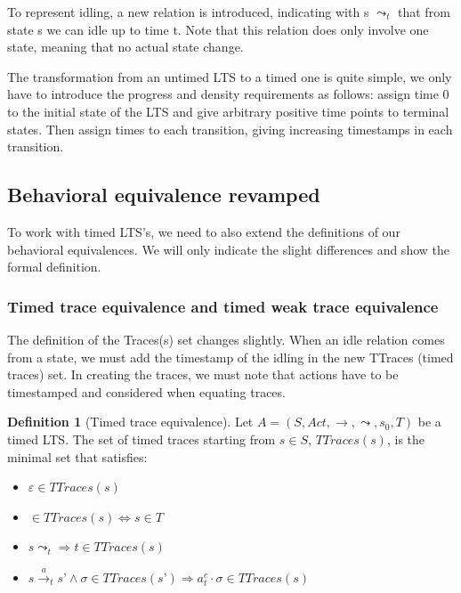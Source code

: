 \documentclass[11pt]{article}
\theoremstyle{definition}
\newtheorem{definition}{Definition}
\newcommand{\cmark}{\ding{51}}
\theoremstyle{plain}
\theoremstyle{definition}
\begin{document}
To represent idling, a new relation is introduced, indicating with s $ \leadsto_{t} $ that from state s we can idle up to time t. Note that this relation does only involve one state, meaning that no actual state change.

The transformation from an untimed LTS to a timed one is quite simple, we only have to introduce the progress and density requirements as follows: assign time 0 to the initial state of the LTS and give arbitrary positive time points to terminal states. Then assign times to each transition, giving increasing timestamps in each transition.

\subsection{Behavioral equivalence revamped}

To work with timed LTS's, we need to also extend the definitions of our behavioral equivalences. We will only indicate the slight differences and show the formal definition.

\subsubsection{Timed trace equivalence and timed weak trace equivalence}

The definition of the Traces(s) set changes slightly. When an idle relation comes from a state, we must add the timestamp of the idling in the new TTraces (timed traces) set. In creating the traces, we must note that actions have to be timestamped and considered when equating traces.

\begin{definition} [Timed trace equivalence]
	Let $ A = (S, Act, \rightarrow, \leadsto, s_0, T) $ be a timed LTS. The set of timed traces starting from $ s \in S$, $ TTraces(s) $, is the minimal set that satisfies:
	\begin{itemize}
		\item $ \varepsilon \in TTraces(s) $
		\item \cmark $ \in TTraces(s) \iff s \in T $
		\item $ s\leadsto_t \Rightarrow t \in TTraces(s) $
		\item $ s\xrightarrow{a}_t s’ \wedge \sigma \in TTraces(s’) \Rightarrow a^c_t\cdot\sigma \in TTraces(s) $
	\end{itemize}
\end{definition}
\end{document}
